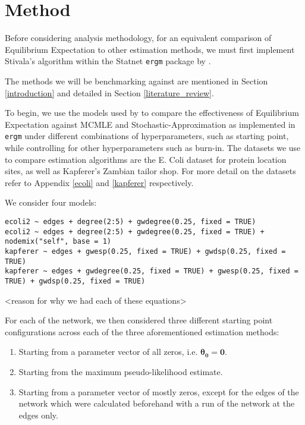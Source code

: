 \section{Method}
\label{sec:method}

Before considering analysis methodology, for an equivalent comparison of Equilibrium Expectation to other estimation methods, we must first implement Stivala's algorithm within the Statnet \texttt{ergm} package by \cite{ergm}. 


The methods we will be benchmarking against are mentioned in Section \ref{introduction} and detailed in Section \ref{literature_review}.

To begin, we use the models used by \cite{hummels2012} to compare the effectiveness of Equilibrium Expectation against MCMLE and Stochastic-Approximation as implemented in \texttt{ergm} under different combinations of hyperparameters, such as starting point, while controlling for other hyperparameters such as burn-in. The datasets we use to compare estimation algorithms are the E. Coli dataset for protein location sites, as well as Kapferer's Zambian tailor shop. For more detail on the datasets refer to Appendix \ref{ecoli} and \ref{kapferer} respectively.

We consider four models:

\begin{lstlisting}
ecoli2 ~ edges + degree(2:5) + gwdegree(0.25, fixed = TRUE)
ecoli2 ~ edges + degree(2:5) + gwdegree(0.25, fixed = TRUE) + nodemix("self", base = 1)
kapferer ~ edges + gwesp(0.25, fixed = TRUE) + gwdsp(0.25, fixed = TRUE)
kapferer ~ edges + gwdegree(0.25, fixed = TRUE) + gwesp(0.25, fixed = TRUE) + gwdsp(0.25, fixed = TRUE)
\end{lstlisting}

<reason for why we had each of these equations>

For each of the network, we then considered three different starting point configurations across each of the three aforementioned estimation methods:
\begin{enumerate}
\item Starting from a parameter vector of all zeros, i.e. $\boldsymbol{\theta_0} = \boldsymbol{0}$.
\item Starting from the maximum pseudo-likelihood estimate.
\item Starting from a parameter vector of mostly zeros, except for the edges of the network which were calculated beforehand with a run of the network at the edges only.
\end{enumerate}

